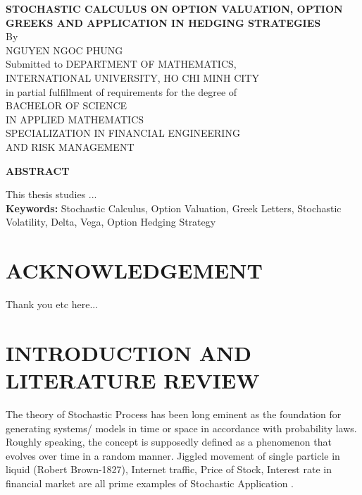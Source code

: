 \documentclass[12pt,a4paper,oneside]{book}
\begin{document}
		
	\newpage
	\thispagestyle{plain}
	\begin{center}
		\large\textbf{STOCHASTIC CALCULUS ON OPTION VALUATION, OPTION GREEKS AND APPLICATION IN HEDGING STRATEGIES} \\
		\normalsize{By}\\
		\large{NGUYEN NGOC PHUNG}\\
		\vskip10mm
		\normalsize{Submitted to DEPARTMENT OF MATHEMATICS,\\INTERNATIONAL UNIVERSITY, HO CHI MINH CITY\\ in partial fulfillment of requirements for the degree of\\
			BACHELOR OF SCIENCE \\ 
			IN APPLIED MATHEMATICS \\
			SPECIALIZATION IN FINANCIAL ENGINEERING  \\ 
			AND RISK MANAGEMENT}\\
		\vspace*{1cm}
		
		
	\vskip10mm
	\large\textbf{ABSTRACT}\\
	\end{center}
	\vskip10mm
	\normalsize{This thesis studies ... 
	}\\
	\vskip10mm
	\textbf{Keywords:}
	\normalsize{Stochastic Calculus, Option Valuation, Greek Letters, Stochastic Volatility, Delta, Vega, Option Hedging Strategy}\\
	
	
	

	\newpage 
	\clearpage
	
	\chapter*{ACKNOWLEDGEMENT}
	
	Thank you etc here...\\

	\newpage 
	\clearpage	
	
	\mainmatter
	\tableofcontents
	\newpage 
	\clearpage
	
	\chapter*{INTRODUCTION AND LITERATURE REVIEW}
	The theory of Stochastic Process has been long eminent as the foundation for generating systems/ models in time or space in accordance with probability laws. Roughly speaking, the concept is supposedly defined as a phenomenon that evolves over time in a random manner. Jiggled movement of single particle in liquid (Robert Brown-1827), Internet traffic, Price of Stock, Interest rate in financial market are all prime examples of Stochastic Application \cite{1}. \\
	
\end{document}
